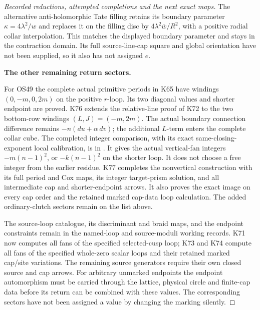 \begin{proof}[Recorded reductions, attempted completions and the next exact maps]
The alternative anti-holomorphic Tate filling retains its
boundary parameter \(\kappa=4\lambda^2/w\) and replaces
it on the filling disc by
\(4\lambda^2\overline w/R^2\), with a positive radial
collar interpolation. This matches the displayed boundary
parameter and stays in the contraction domain. Its full
source-line-cap square and global orientation have not
been supplied, so it also has not assigned \(e\).

\par\medskip\noindent\textbf{The other remaining return sectors.}\par\nopagebreak[4]
For OS49 the complete actual primitive periods in K65 have
windings \((0,-m,0,2m)\) on the positive \(r\)-loop.
Its two diagonal values and shorter endpoint are proved.
K76 extends the relative-line proof of K72 to the two
bottom-row windings \((L,J)=(-m,2m)\).
The actual boundary connection difference remains
\(-n(du+\alpha\,dv)\); the additional \(L\)-term enters
the complete collar cube. The completed integer comparison,
with its exact same-closing-exponent local calibration, is in
.
It gives the actual vertical-fan integers
\(-m(n-1)^2\), or \(-k(n-1)^2\) on the shorter loop.
It does not choose a free integer from the earlier residue.
K77 completes the nonvertical construction with its full
period and Cox maps, its integer target-prism solution,
and all intermediate cap and shorter-endpoint arrows.
It also proves the exact image on every cap order and
the retained marked cap-data loop calculation. The
added ordinary-clutch sectors remain on the list above.

The source-loop catalogue, its discriminant and braid maps,
and the endpoint constraints remain in the named-loop and
source-moduli working records. K71 now computes all fans of
the specified selected-cusp loop; K73 and K74 compute all
fans of the specified whole-zero scalar loops and their
retained marked cap/site variations. The remaining source
generators require their own closed source and cap arrows.
For arbitrary unmarked endpoints the endpoint automorphism
must be carried through the lattice, physical circle and
finite-cap data before its return can be combined with
these values. The corresponding sectors have not been
assigned a value by changing the marking silently.
\end{proof}
